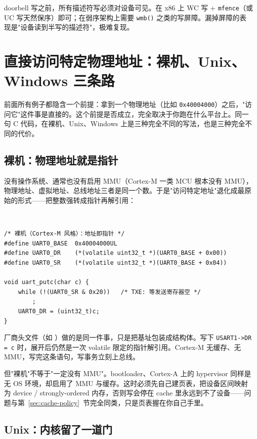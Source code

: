 \documentclass[12pt,a4paper,fontset=fandol]{ctexbook}
\newcommand{\clabel}{%
  \begin{tcolorbox}[enhanced,colback=cheadbg,colframe=cheadbg,
    arc=1mm,boxrule=0mm,left=6pt,right=6pt,top=2pt,bottom=2pt,
    halign=left,oversize]
    \textcolor{white}{\small\bfseries C}
  \end{tcolorbox}\vspace{-4pt}}
\newcommand{\Tp}[1]{\texttt{#1}}
\begin{document}
\begin{tcolorbox}[note={doorbell 的写必须是"可见且有序"的}]
doorbell 写之前，所有描述符写必须对设备可见。在 x86 上 WC 写 + \texttt{mfence}（或 UC 写天然保序）即可；在弱序架构上需要 \Tp{wmb()} 之类的写屏障。漏掉屏障的表现是"设备读到半写的描述符"，极难复现。
\end{tcolorbox}

\section{直接访问特定物理地址：裸机、Unix、Windows 三条路}\label{sec:direct-phys}

前面所有例子都隐含一个前提：拿到一个物理地址（比如 \texttt{0x40004000}）之后，"访问它"这件事是直接的。这个前提是否成立，完全取决于你跑在什么平台上。同一句 C 代码，在裸机、Unix、Windows 上是三种完全不同的写法，也是三种完全不同的代价。

\subsection{裸机：物理地址就是指针}

没有操作系统、通常也没有启用 MMU（Cortex-M 一类 MCU 根本没有 MMU），物理地址、虚拟地址、总线地址三者是同一个数。于是"访问特定地址"退化成最原始的形式——把整数强转成指针再解引用：

\clabel
\begin{lstlisting}[style=cstyle]
/* 裸机（Cortex-M 风格）：地址即指针 */
#define UART0_BASE  0x40004000UL
#define UART0_DR    (*(volatile uint32_t *)(UART0_BASE + 0x00))
#define UART0_SR    (*(volatile uint32_t *)(UART0_BASE + 0x04))

void uart_putc(char c) {
    while (!(UART0_SR & 0x20))   /* TXE: 等发送寄存器空 */
        ;
    UART0_DR = (uint32_t)c;
}
\end{lstlisting}

厂商头文件（如 ）做的是同一件事，只是把基址包装成结构体。写下 \texttt{USART1->DR = c} 时，展开后仍然是一次 volatile 限定的指针解引用。Cortex-M 无缓存、无 MMU，写完这条语句，写事务立刻上总线。

但"裸机"不等于"一定没有 MMU"。bootloader、Cortex-A 上的 hypervisor 同样是无 OS 环境，却启用了 MMU 与缓存。这时必须先自己建页表，把设备区间映射为 device / strongly-ordered 内存，否则写会停在 cache 里永远到不了设备——问题与第~\ref{sec:cache-policy}~节完全同类，只是页表握在你自己手里。

\subsection{Unix：内核留了一道门}
\end{document}
